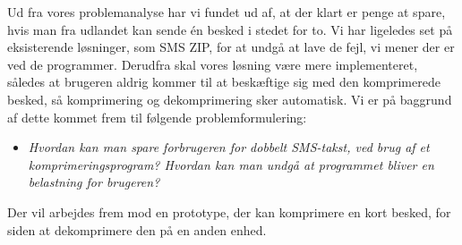 Ud fra vores problemanalyse har vi fundet ud af, at der klart er penge at spare, hvis man fra udlandet kan sende én besked i stedet for to. Vi har ligeledes set på eksisterende løsninger, som SMS ZIP, for at undgå at lave de fejl, vi mener der er ved de programmer. Derudfra skal vores løsning være mere implementeret, således at brugeren aldrig kommer til at beskæftige sig med den komprimerede besked, så komprimering og dekomprimering sker automatisk. Vi er på baggrund af dette kommet frem til følgende problemformulering:

\begin{itemize}
\item[] \emph{Hvordan kan man spare forbrugeren for dobbelt SMS-takst, ved brug af et komprimeringsprogram? Hvordan kan man undgå at programmet bliver en belastning for brugeren?}
\end{itemize}

Der vil arbejdes frem mod en prototype, der kan komprimere en kort besked, for siden at dekomprimere den på en anden enhed. 